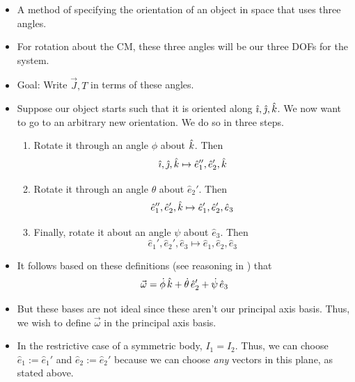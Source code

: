 \documentclass[../notes.tex]{subfiles}
\begin{document}
\begin{itemize}
    \begin{itemize}
        \item A method of specifying the orientation of an object in space that uses three angles.
        \item For rotation about the CM, these three angles will be our three DOFs for the system.
        \item Goal: Write $\vec{J},T$ in terms of these angles.
        \item Suppose our object starts such that it is oriented along $\hat{\imath},\hat{\jmath},\hat{k}$. We now want to go to an arbitrary new orientation. We do so in three steps.
        \begin{enumerate}
            \item Rotate it through an angle $\phi$ about $\hat{k}$. Then
            \begin{equation*}
                \hat{\imath},\hat{\jmath},\hat{k} \mapsto \hat{e}_1'',\hat{e}_2',\hat{k}
            \end{equation*}
            \item Rotate it through an angle $\theta$ about $\hat{e}_2'$. Then
            \begin{equation*}
                \hat{e}_1'',\hat{e}_2',\hat{k} \mapsto \hat{e}_1',\hat{e}_2',\hat{e}_3
            \end{equation*}
            \item Finally, rotate it about an angle $\psi$ about $\hat{e}_3$. Then
            \begin{equation*}
                \hat{e}_1',\hat{e}_2',\hat{e}_3 \mapsto \hat{e}_1,\hat{e}_2,\hat{e}_3
            \end{equation*}
        \end{enumerate}
        \item It follows based on these definitions (see reasoning in \textcite{bib:KibbleBerkshire}) that
        \begin{equation*}
            \vec{\omega} = \dot{\phi}\,\hat{k}+\dot{\theta}\,\hat{e}_2'+\dot{\psi}\,\hat{e}_3
        \end{equation*}
        \item But these bases are not ideal since these aren't our principal axis basis. Thus, we wish to define $\vec{\omega}$ in the principal axis basis.
        \item In the restrictive case of a symmetric body, $I_1=I_2$. Thus, we can choose $\hat{e}_1:=\hat{e}_1'$ and $\hat{e}_2:=\hat{e}_2'$ because we can choose \emph{any} vectors in this plane, as stated above.

\end{itemize}
\end{itemize}
\end{document}
